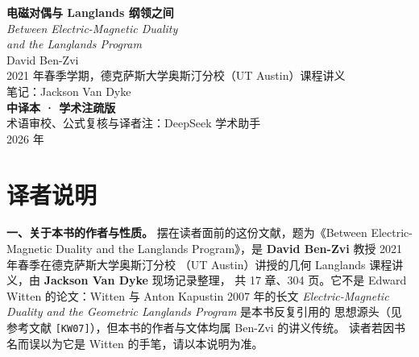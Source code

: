



\begin{titlepage}
  \vspace*{2.2cm}
  \begin{center}
    {\LARGE\bfseries 电磁对偶与 Langlands 纲领之间}\\[0.8cm]
    {\large\itshape Between Electric-Magnetic Duality\\[0.15cm]
      and the Langlands Program}\\[1.6cm]
    {\Large David Ben-Zvi}\\[0.35cm]
    {\normalsize 2021 年春季学期，德克萨斯大学奥斯汀分校（UT Austin）课程讲义}\\[0.25cm]
    {\normalsize 笔记：Jackson Van Dyke}\\[2.2cm]
    {\Large\bfseries 中译本 · 学术注疏版}\\[0.5cm]
    {\normalsize 术语审校、公式复核与译者注：DeepSeek 学术助手}\\[0.2cm]
    {\normalsize 2026 年}
  \end{center}
\end{titlepage}

\frontmatter

\chapter*{译者说明}

\noindent\textbf{一、关于本书的作者与性质。}
摆在读者面前的这份文献，题为《Between Electric-Magnetic Duality and the Langlands
Program》，是 \textbf{David Ben-Zvi} 教授 2021 年春季在德克萨斯大学奥斯汀分校
（UT Austin）讲授的几何 Langlands 课程讲义，由 \textbf{Jackson Van Dyke} 现场记录整理，
共 17 章、304 页。它不是 Edward Witten 的论文：Witten 与 Anton Kapustin 2007 年的长文
\textit{Electric-Magnetic Duality and the Geometric Langlands Program} 是本书反复引用的
思想源头（见参考文献 \texttt{[KW07]}），但本书的作者与文体均属 Ben-Zvi 的讲义传统。
读者若因书名而误以为它是 Witten 的手笔，请以本说明为准。

